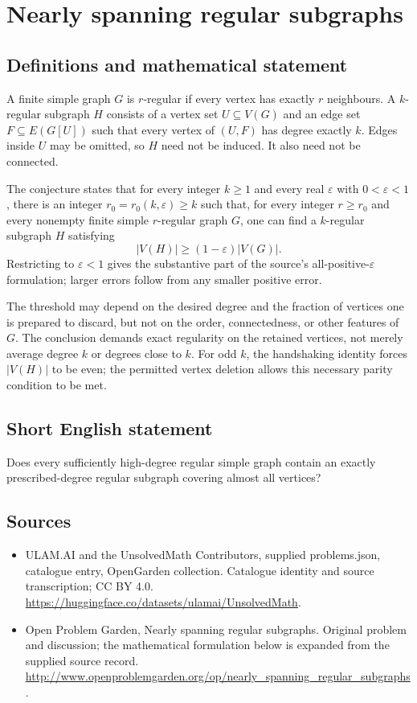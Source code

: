 \documentclass[11pt,a4paper]{article}
\begin{document}
\section*{Nearly spanning regular subgraphs}\label{statement}

\subsection{Definitions and mathematical statement}
A finite simple graph $G$ is $r$-regular if every vertex has exactly
$r$ neighbours. A $k$-regular subgraph $H$ consists of a vertex set
$U\subseteq V(G)$ and an edge set $F\subseteq E(G[U])$ such that
every vertex of $(U,F)$ has degree exactly $k$. Edges inside $U$
may be omitted, so $H$ need not be induced. It also need not be
connected.

The conjecture states that for every integer $k\geq1$ and every
real $\varepsilon$ with $0<\varepsilon<1$, there is an integer
$r_0=r_0(k,\varepsilon)\geq k$ such that, for every integer
$r\geq r_0$ and every nonempty finite simple $r$-regular graph $G$,
one can find a $k$-regular subgraph $H$ satisfying
\[
 |V(H)|\geq(1-\varepsilon)|V(G)|.
\]
Restricting to $\varepsilon<1$ gives the substantive part of the
source's all-positive-$\varepsilon$ formulation; larger errors
follow from any smaller positive error.

The threshold may depend on the desired degree and the fraction
of vertices one is prepared to discard, but not on the order,
connectedness, or other features of $G$. The conclusion demands
exact regularity on the retained vertices, not merely average
degree $k$ or degrees close to $k$. For odd $k$, the handshaking
identity forces $|V(H)|$ to be even; the permitted vertex deletion
allows this necessary parity condition to be met.
\subsection{Short English statement}
Does every sufficiently high-degree regular simple graph contain an exactly prescribed-degree regular subgraph covering almost all vertices?
\subsection{Sources}
\begin{itemize}
\item[S1] ULAM.AI and the UnsolvedMath Contributors, supplied problems.json, catalogue entry, OpenGarden collection. Catalogue identity and source transcription; CC BY 4.0.
\url{https://huggingface.co/datasets/ulamai/UnsolvedMath}.
\item[S2] Open Problem Garden, Nearly spanning regular subgraphs. Original problem and discussion; the mathematical formulation below is expanded from the supplied source record.
\url{http://www.openproblemgarden.org/op/nearly_spanning_regular_subgraphs}.
\end{itemize}
\end{document}
